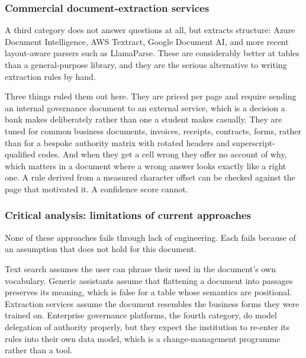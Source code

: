 
\subsubsection{Commercial document-extraction services}

A third category does not answer questions at all, but extracts structure:
Azure Document Intelligence, AWS Textract, Google Document AI, and more recent
layout-aware parsers such as LlamaParse. These are considerably better at tables
than a general-purpose library, and they are the serious alternative to writing
extraction rules by hand.

Three things ruled them out here. They are priced per page and require sending
an internal governance document to an external service, which is a decision a
bank makes deliberately rather than one a student makes casually. They are tuned
for common business documents, invoices, receipts, contracts, forms, rather than
for a bespoke authority matrix with rotated headers and superscript-qualified
codes. And when they get a cell wrong they offer no account of why, which
matters in a document where a wrong answer looks exactly like a right one. A
rule derived from a measured character offset can be checked against the page
that motivated it. A confidence score cannot.

\subsubsection{Critical analysis: limitations of current approaches}

None of these approaches fails through lack of engineering. Each fails because
of an assumption that does not hold for this document.

Text search assumes the user can phrase their need in the document's own
vocabulary. Generic assistants assume that flattening a document into passages
preserves its meaning, which is false for a table whose semantics are
positional. Extraction services assume the document resembles the business forms
they were trained on. Enterprise governance platforms, the fourth category, do
model delegation of authority properly, but they expect the institution to
re-enter its rules into their own data model, which is a change-management
programme rather than a tool.

